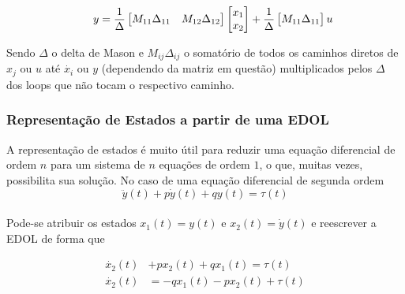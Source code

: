 \documentclass{article}
\numberwithin{equation}{section}
\begin{document}
\begin{equation*}
    \hspace{0.5cm} y = \frac{1}{\Delta}
    \begin{bmatrix}
        M_{11}\Delta_{11} & M_{12}\Delta_{12}\\
    \end{bmatrix}
    \begin{bmatrix}
        x_{1} \\
        x_{2}
    \end{bmatrix}
    + \frac{1}{\Delta}
    \begin{bmatrix}
        M_{11}\Delta_{11}
    \end{bmatrix}
    u
\end{equation*}

Sendo $\Delta$ o delta de Mason e $M_{ij}\Delta_{ij}$ o somatório de todos os caminhos diretos de $x_{j}$ ou $u$ até $\dot{x_{i}}$ ou $y$ (dependendo da matriz em questão) multiplicados pelos $\Delta$ dos loops que não tocam o respectivo caminho.

\subsubsection{Representação de Estados a partir de uma EDOL}
\label{subsubsec:est_edol}
A representação de estados é muito útil para reduzir uma equação diferencial de ordem $n$ para um sistema de $n$ equações de ordem $1$, o que, muitas vezes, possibilita sua solução. No caso de uma equação diferencial de segunda ordem
\begin{equation*}
    \ddot{y}(t)+p\dot{y}(t)+qy(t)=\tau(t)
\end{equation*} \\
Pode-se atribuir os estados $x_{1}(t)=y(t)$ e $x_{2}(t)=\dot{y}(t)$ e reescrever a EDOL de forma que

\begin{equation*}
    \begin{split}
        \dot{x_2}(t)&+px_{2}(t)+qx_{1}(t)=\tau(t) \\
        \dot{x_2}(t)&=-qx_{1}(t)-px_{2}(t)+\tau(t)
    \end{split}
\end{equation*}
\end{document}
